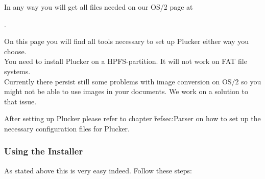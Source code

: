 In any way you will get all files needed on our OS/2 page at

\textit{}.

On this page you will find all tools necessary to set up Plucker
either way you choose.\\

\note You need to install Plucker on a HPFS-partition. It will not
work on FAT file systems.\\

\note Currently there persist still some problems with image
conversion on OS/2 so you might not be able to use images in your
documents. We work on a solution to that issue.


After setting up Plucker please refer to chapter \~ref{sec:Parser} on
how to set up the necessary configuration files for Plucker.

\subsubsection{Using the Installer}

As stated above this is very easy indeed. Follow these steps:

